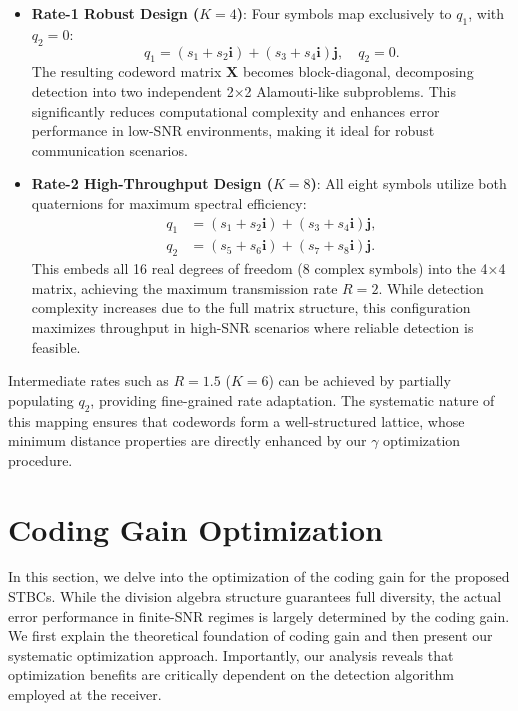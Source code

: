 \documentclass[twocolumn,conference]{IEEEtran}
\begin{document}
\begin{itemize}
    \item \textbf{Rate-1 Robust Design ($K=4$)}: Four symbols map exclusively to $q_1$, with $q_2 = 0$:
    \begin{equation}
    q_1 = (s_1 + s_2 \mathbf{i}) + (s_3 + s_4 \mathbf{i}) \mathbf{j}, \quad q_2 = 0.
    \end{equation}
    The resulting codeword matrix $\mathbf{X}$ becomes block-diagonal, decomposing detection into two independent 2×2 Alamouti-like subproblems. This significantly reduces computational complexity and enhances error performance in low-SNR environments, making it ideal for robust communication scenarios.

    \item \textbf{Rate-2 High-Throughput Design ($K=8$)}: All eight symbols utilize both quaternions for maximum spectral efficiency:
    \begin{align}
        q_1 &= (s_1 + s_2 \mathbf{i}) + (s_3 + s_4 \mathbf{i}) \mathbf{j}, \\
        q_2 &= (s_5 + s_6 \mathbf{i}) + (s_7 + s_8 \mathbf{i}) \mathbf{j}.
    \end{align}
    This embeds all 16 real degrees of freedom (8 complex symbols) into the 4×4 matrix, achieving the maximum transmission rate $R=2$. While detection complexity increases due to the full matrix structure, this configuration maximizes throughput in high-SNR scenarios where reliable detection is feasible.
\end{itemize}

Intermediate rates such as $R=1.5$ ($K=6$) can be achieved by partially populating $q_2$, providing fine-grained rate adaptation. The systematic nature of this mapping ensures that codewords form a well-structured lattice, whose minimum distance properties are directly enhanced by our $\gamma$ optimization procedure.

\section{Coding Gain Optimization}
In this section, we delve into the optimization of the coding gain for the proposed STBCs. 
While the division algebra structure guarantees full diversity, the actual error performance in finite-SNR regimes is largely determined by the coding gain. 
We first explain the theoretical foundation of coding gain and then present our systematic optimization approach. 
Importantly, our analysis reveals that optimization benefits are critically dependent on the detection algorithm employed at the receiver.
\end{document}
